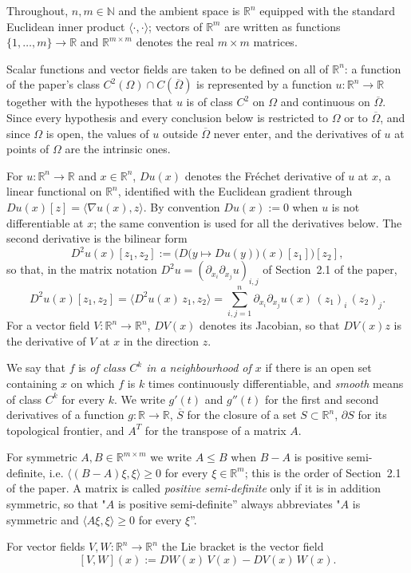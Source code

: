 \begin{definition}
Throughout, $n,m\in\mathbb{N}$ and the ambient space is $\mathbb{R}^n$ equipped with the standard
Euclidean inner product $\langle\cdot,\cdot\rangle$; vectors of $\mathbb{R}^m$ are written as
functions $\{1,\dots,m\}\to\mathbb{R}$ and $\mathbb{R}^{m\times m}$ denotes the real
$m\times m$ matrices.

Scalar functions and vector fields are taken to be defined on all of $\mathbb{R}^n$:
a function of the paper's class $C^2(\Omega)\cap C(\overline\Omega)$ is represented by a function
$u:\mathbb{R}^n\to\mathbb{R}$ together with the hypotheses that $u$ is of class $C^2$ on $\Omega$
and continuous on $\overline\Omega$. Since every hypothesis and every conclusion below is
restricted to $\Omega$ or to $\overline\Omega$, and since $\Omega$ is open, the values of $u$
outside $\overline\Omega$ never enter, and the derivatives of $u$ at points of $\Omega$ are the
intrinsic ones.

For $u:\mathbb{R}^n\to\mathbb{R}$ and $x\in\mathbb{R}^n$, $Du(x)$ denotes the Fr\'echet derivative
of $u$ at $x$, a linear functional on $\mathbb{R}^n$, identified with the Euclidean gradient
through $Du(x)[z]=\langle\nabla u(x),z\rangle$. By convention $Du(x):=0$ when $u$ is not
differentiable at $x$; the same convention is used for all the derivatives below. The second
derivative is the bilinear form
$$D^2u(x)[z_1,z_2]:=\Big(D\big(y\mapsto Du(y)\big)(x)[z_1]\Big)[z_2],$$
so that, in the matrix notation $D^2u=(\partial_{x_i}\partial_{x_j}u)_{i,j}$ of Section~2.1 of
the paper,
$$D^2u(x)[z_1,z_2]=\langle D^2u(x)\,z_1,z_2\rangle=\sum_{i,j=1}^n
\partial_{x_i}\partial_{x_j}u(x)\,(z_1)_i\,(z_2)_j.$$
For a vector field
$V:\mathbb{R}^n\to\mathbb{R}^n$, $DV(x)$ denotes its Jacobian, so that $DV(x)z$ is the derivative
of $V$ at $x$ in the direction $z$.

We say that $f$ is \emph{of class $C^k$ in a neighbourhood of $x$} if there is an open set
containing $x$ on which $f$ is $k$ times continuously differentiable, and \emph{smooth} means of
class $C^k$ for every $k$. We write $g'(t)$ and $g''(t)$ for the first and second derivatives of a
function $g:\mathbb{R}\to\mathbb{R}$, $\overline{S}$ for the closure of a set $S\subset\mathbb{R}^n$,
$\partial S$ for its topological frontier, and $A^T$ for the transpose of a matrix $A$.
\end{definition}

\begin{definition}
For symmetric $A,B\in\mathbb{R}^{m\times m}$ we write $A\leq B$ when $B-A$ is positive
semi-definite, i.e. $\langle(B-A)\xi,\xi\rangle\geq0$ for every $\xi\in\mathbb{R}^m$; this is the
order of Section~2.1 of the paper. A matrix is called \emph{positive semi-definite} only if it is
in addition symmetric, so that "$A$ is positive semi-definite'' always abbreviates "$A$ is
symmetric and $\langle A\xi,\xi\rangle\geq0$ for every $\xi$''.

For vector fields $V,W:\mathbb{R}^n\to\mathbb{R}^n$ the Lie bracket is the vector field
$$[V,W](x):=DW(x)\,V(x)-DV(x)\,W(x).$$
\end{definition}

